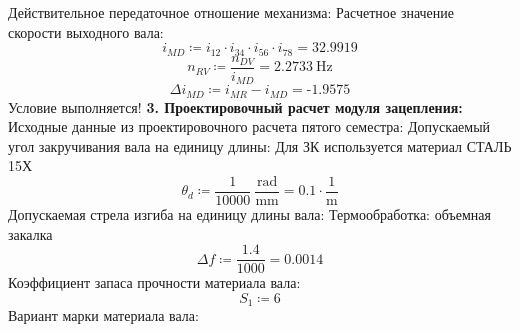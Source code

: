 \documentclass{article}
\newcommand{\defeq}{\coloneq} %
\begin{document}
\colorbox[HTML]{000000}{Действительное передаточное \newline
отношение механизма:}\newline
\colorbox[HTML]{000000}{Расчетное значение скорости выходного вала:}\newline
\begin{equation*}
i_{MD} \defeq \textit{i}_{\textit{12}} \cdot \textit{i}_{\textit{34}} \cdot \textit{i}_{\textit{56}} \cdot \textit{i}_{\textit{78}} = {32.9919}
\end{equation*}
\begin{equation*}
n_{RV} \defeq \frac{n_{DV}}{i_{MD}} = {2.2733 \: \mathrm{Hz}}
\end{equation*}
\begin{equation*}
Δi_{MD} \defeq i_{MR}-i_{MD} = { \operatorname{-} 1.9575}
\end{equation*}
\colorbox[HTML]{FFFF80}{Условие выполняется!}\newline
\colorbox[HTML]{000000}{\textbf{3. Проектировочный расчет модуля зацепления:}}\newline
\colorbox[HTML]{000000}{Исходные данные из проектировочного расчета пятого семестра:}\newline
\colorbox[HTML]{000000}{Допускаемый угол закручивания \newline
вала на единицу длины:}\newline
\colorbox[HTML]{000000}{Для ЗК используется материал СТАЛЬ 15Х}\newline
\begin{equation*}
θ_{d} \defeq \frac{1}{10000} \: \frac{\mathrm{rad}}{\mathrm{mm}} = {0.1 \cdot \frac{1}{\mathrm{m}}}
\end{equation*}
\colorbox[HTML]{000000}{Допускаемая стрела изгиба на единицу длины вала:}\newline
\colorbox[HTML]{000000}{Термообработка:}\newline
\colorbox[HTML]{000000}{объемная закалка}\newline
\begin{equation*}
Δf \defeq \frac{1.4}{1000} = {0.0014}
\end{equation*}
\colorbox[HTML]{000000}{Коэффициент запаса прочности материала вала:}\newline
\begin{equation*}
\textit{S}_{\textit{1}} \defeq 6
\end{equation*}
\colorbox[HTML]{000000}{Вариант марки материала вала:}\newline
\end{document}

